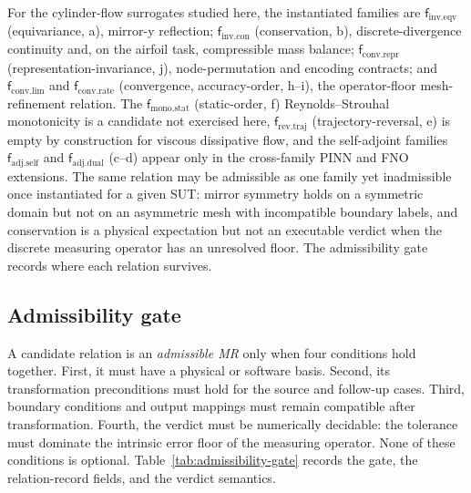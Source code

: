 \documentclass[preprint,12pt,authoryear]{elsarticle}
\providecommand{\fIeqv}{\mathsf{f}_{\mathrm{inv}.\mathrm{eqv}}}
\providecommand{\fIcon}{\mathsf{f}_{\mathrm{inv}.\mathrm{con}}}
\providecommand{\fAself}{\mathsf{f}_{\mathrm{adj}.\mathrm{self}}}
\providecommand{\fAdual}{\mathsf{f}_{\mathrm{adj}.\mathrm{dual}}}
\providecommand{\fRtraj}{\mathsf{f}_{\mathrm{rev}.\mathrm{traj}}}
\providecommand{\fMstat}{\mathsf{f}_{\mathrm{mono}.\mathrm{stat}}}
\providecommand{\fClim}{\mathsf{f}_{\mathrm{conv}.\mathrm{lim}}}
\providecommand{\fCrate}{\mathsf{f}_{\mathrm{conv}.\mathrm{rate}}}
\providecommand{\fCrepr}{\mathsf{f}_{\mathrm{conv}.\mathrm{repr}}}
\begin{document}
For the cylinder-flow surrogates studied here, the instantiated families are $\fIeqv$ (equivariance, a), mirror-y reflection; $\fIcon$ (conservation, b), discrete-divergence continuity and, on the airfoil task, compressible mass balance; $\fCrepr$ (representation-invariance, j), node-permutation and encoding contracts; and $\fClim$ and $\fCrate$ (convergence, accuracy-order, h--i), the operator-floor mesh-refinement relation. The $\fMstat$ (static-order, f) Reynolds--Strouhal monotonicity is a candidate not exercised here, $\fRtraj$ (trajectory-reversal, e) is empty by construction for viscous dissipative flow, and the self-adjoint families $\fAself$ and $\fAdual$ (c--d) appear only in the cross-family PINN and FNO extensions. The same relation may be admissible as one family yet inadmissible once instantiated for a given SUT: mirror symmetry holds on a symmetric domain but not on an asymmetric mesh with incompatible boundary labels, and conservation is a physical expectation but not an executable verdict when the discrete measuring operator has an unresolved floor. The admissibility gate records where each relation survives.

\subsection{Admissibility gate}
\label{subsec:admissibility-gate}

A candidate relation is an \emph{admissible MR} only when four conditions hold together. First, it must have a physical or software basis. Second, its transformation preconditions must hold for the source and follow-up cases. Third, boundary conditions and output mappings must remain compatible after transformation. Fourth, the verdict must be numerically decidable: the tolerance must dominate the intrinsic error floor of the measuring operator. None of these conditions is optional. Table~\ref{tab:admissibility-gate} records the gate, the relation-record fields, and the verdict semantics.
\end{document}
